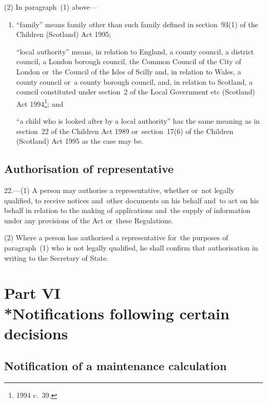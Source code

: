 \documentclass[12pt,a4paper]{article}
\begin{document}
(2) In paragraph~(1) above—
\begin{enumerate}\item[]
“family” means family other than such family defined in section~93(1) of the Children (Scotland) Act 1995;

\pagebreak[3]

“local authority” means, in relation to England, a county council, a district council, a London borough council, the Common Council of the City of London or~the Council of the Isles of Scilly and, in relation to Wales, a county council or~a county borough council, and, in relation to Scotland, a council constituted under section~2 of the Local Government etc (Scotland) Act 1994\footnote{1994 c.\ 39.}; and

“a child who is looked after by a local authority” has the same meaning as in section~22 of the Children Act 1989 or~section~17(6) of the Children (Scotland) Act 1995 as the case may be.
\end{enumerate}


\subsection[22. Authorisation of representative]{Authorisation of representative}

22.---(1)  A person may authorise a representative, whether or~not legally qualified, to receive notices and~other documents on his behalf and~to act on his behalf in relation to the making of applications and~the supply of information under any provisions of the Act or~these Regulations.

(2) Where a person has authorised a representative for~the purposes of paragraph~(1) who is not legally qualified, he shall confirm that authorisation in writing to the Secretary of State.

\section[Part VI --- Notifications following certain decisions]{Part VI\\*Notifications following certain decisions}

\renewcommand\parthead{--- Part VI}

\subsection[23. Notification of a maintenance calculation]{Notification of a maintenance calculation}
\end{document}
